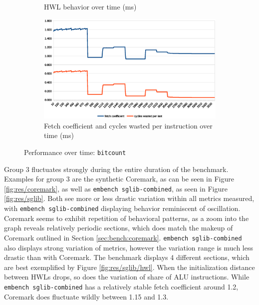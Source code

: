\documentclass[../bachelor_paper.tex]{subfiles}
\begin{document}
\begin{figure}
\begin{subfigure}{\textwidth}
        \caption{\ac{HWL} behavior over time (ms)}
        \label{fig:res/bitcount/hwl}
    \end{subfigure}
    \begin{subfigure}{\textwidth}
        \centering
        \includegraphics[height=0.26\textheight]{img/graph/mibench/bitcount_fetch_waste.eps}
        \caption{Fetch coefficient and cycles wasted per instruction over time (ms)}
        \label{fig:res/bitcount/fetch_waste}
    \end{subfigure}
    \caption{Performance over time: \texttt{bitcount}}
    \label{fig:res/bitcount}
\end{figure}

Group 3 fluctuates strongly during the entire duration of the benchmark. Examples for group 3 are the synthetic Coremark, as can be seen in Figure \ref{fig:res/coremark}, as well as \texttt{embench sglib-combined}, as seen in Figure \ref{fig:res/sglib}. Both see more or less drastic variation within all metrics measured, with \texttt{embench sglib-combined} displaying behavior reminiscent of oscillation. Coremark seems to exhibit repetition of behavioral patterns, as a zoom into the graph reveals relatively periodic sections, which does match the makeup of Coremark outlined in Section \ref{sec:bench:coremark}. \texttt{embench sglib-combined} also displays strong variation of metrics, however the variation range is much less drastic than with Coremark. The benchmark displays 4 different sections, which are best exemplified by Figure \ref{fig:res/sglib/hwl}. When the initialization distance between \acp{HWL} drops, so does the variation of share of \ac{ALU} instructions. While \texttt{embench sglib-combined} has a relatively stable fetch coefficient around 1.2, Coremark does fluctuate wildly between 1.15 and 1.3.
\end{document}
